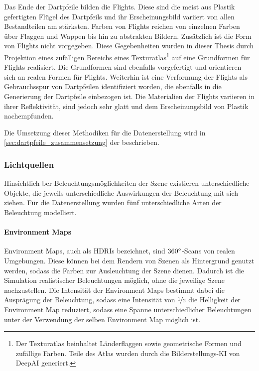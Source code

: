 Das Ende der Dartpfeile bilden die Flights. Diese sind die meist aus Plastik gefertigten Flügel des Dartpfeils und ihr Erscheinungsbild variiert von allen Bestandteilen am stärksten. Farben von Flights reichen von einzelnen Farben über Flaggen und Wappen bis hin zu abstrakten Bildern. Zusätzlich ist die Form von Flights nicht vorgegeben. Diese Gegebenheiten wurden in dieser Thesis durch Projektion eines zufälligen Bereichs eines Texturatlas\footnote{Der Texturatlas beinhaltet Länderflaggen sowie geometrische Formen und zufällige Farben. Teile des Atlas wurden durch die Bilderstellungs-KI von DeepAI \cite{deepai-image} generiert.} auf eine Grundformen für Flights realisiert. Die Grundformen sind ebenfalls vorgefertigt und orientieren sich an realen Formen für Flights. Weiterhin ist eine Verformung der Flights als Gebrauchsspur von Dartpfeilen identifiziert worden, die ebenfalls in die Generierung der Dartpfeile einbezogen ist. Die Materialien der Flights variieren in ihrer Reflektivität, sind jedoch sehr glatt und dem Erscheinungsbild von Plastik nachempfunden.

Die Umsetzung dieser Methodiken für die Datenerstellung wird in \autoref{sec:dartpfeile_zusammensetzung} der  beschrieben.

\subsubsection{Lichtquellen}
\label{sec:lichter}

Hinsichtlich ber Beleuchtungsmöglichkeiten der Szene existieren unterschiedliche Objekte, die jeweils unterschiedliche Auswirkungen der Beleuchtung mit sich ziehen. Für die Datenerstellung wurden fünf unterschiedliche Arten der Beleuchtung modelliert.

\paragraph{Environment Maps}

Environment Maps, auch als HDRIs bezeichnet, sind $360^{\circ}$-Scans von realen Umgebungen. Diese können bei dem Rendern von Szenen als Hintergrund genutzt werden, sodass die Farben zur Ausleuchtung der Szene dienen. Dadurch ist die Simulation realistischer Beleuchtungen möglich, ohne die jeweilige Szene nachzustellen. Die Intensität der Environment Maps bestimmt dabei die Ausprägung der Beleuchtung, sodass eine Intensität von $\nicefrac{1}{2}$ die Helligkeit der Environment Map reduziert, sodass eine Spanne unterschiedlicher Beleuchtungen unter der Verwendung der selben Environment Map möglich ist.


